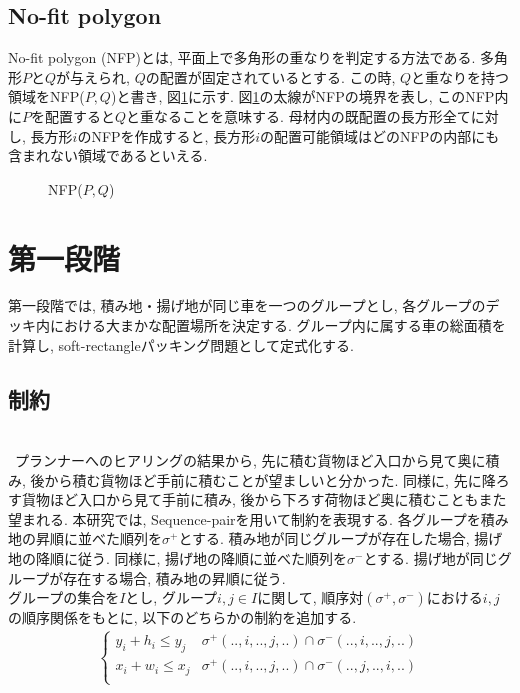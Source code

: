 \subsection{No-fit polygon}
No-fit polygon (NFP)とは, 平面上で多角形の重なりを判定する方法である\cite{nfp}\cite{nfp2}. 
多角形$P$と$Q$が与えられ, $Q$の配置が固定されているとする. 
この時, $Q$と重なりを持つ領域をNFP($P,Q$)と書き, 図\ref{figure31}に示す. 
図\ref{figure31}の太線がNFPの境界を表し, このNFP内に$P$を配置すると$Q$と重なることを意味する. 
母材内の既配置の長方形全てに対し, 長方形$i$のNFPを作成すると, 長方形$i$の配置可能領域はどのNFPの内部にも含まれない領域であるといえる. 

\begin{figure}
    \label{figure31}
    \caption{NFP($P,Q$)}
\end{figure}

\section{第一段階}
第一段階では, 積み地・揚げ地が同じ車を一つのグループとし, 各グループのデッキ内における大まかな配置場所を決定する. 
グループ内に属する車の総面積を計算し, soft-rectangleパッキング問題として定式化する. 

\subsection{制約}
\\
\ プランナーへのヒアリングの結果から, 先に積む貨物ほど入口から見て奥に積み, 後から積む貨物ほど手前に積むことが望ましいと分かった. 
同様に, 先に降ろす貨物ほど入口から見て手前に積み, 後から下ろす荷物ほど奥に積むこともまた望まれる. 
本研究では, Sequence-pairを用いて制約を表現する. 
各グループを積み地の昇順に並べた順列を$\sigma^+$とする. 
積み地が同じグループが存在した場合, 揚げ地の降順に従う. 
同様に, 揚げ地の降順に並べた順列を$\sigma^-$とする.
揚げ地が同じグループが存在する場合, 積み地の昇順に従う. \\
グループの集合を$I$とし, グループ$i,j \in I$に関して, 順序対$(\sigma^+,\sigma^-)$における$i,j$の順序関係をもとに, 以下のどちらかの制約を追加する. \\
\begin{eqnarray}
    \left\{
        \begin{array}{ll}
            y_i + h_i \leq y_j & \sigma^+(..,i,..,j,..) \cap \sigma^-(..,i,..,j,..) \\
            x_i + w_i \leq x_j & \sigma^+(..,i,..,j,..) \cap \sigma^-(..,j,..,i,..) \\
        \end{array}
    \right.
\end{eqnarray}\\


